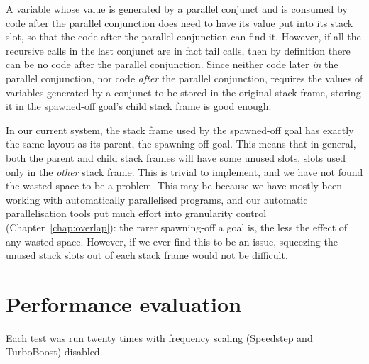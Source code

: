 A variable whose value is generated by a parallel conjunct
and is consumed by code after the parallel conjunction
does need to have its value put into its stack slot,
so that the code after the parallel conjunction can find it.
However, if all the recursive calls in the last conjunct
are in fact tail calls, then by definition
there can be no code after the parallel conjunction.
Since neither code later \emph{in} the parallel conjunction,
nor code \emph{after} the parallel conjunction,
requires the values of variables generated by a conjunct
to be stored in the original stack frame,
storing it in the spawned-off goal's child stack frame is good enough.

In our current system,
the stack frame used by the spawned-off goal
has exactly the same layout as its parent, the spawning-off goal.
This means that in general,
both the parent and child stack frames will have some unused slots,
slots used only in the \emph{other} stack frame.
This is trivial to implement,
and we have not found the wasted space to be a problem.
This may be because we have mostly been working with
automatically parallelised programs,
and our automatic parallelisation tools
put much effort into granularity control (Chapter~\ref{chap:overlap}):
the rarer spawning-off a goal is,
the less the effect of any wasted space.
However, if we ever find this to be an issue,
squeezing the unused stack slots out of each stack frame
would not be difficult.



\section{Performance evaluation}
\label{sec:lc_perf}


Each test was run twenty times
with frequency scaling (Speedstep and TurboBoost) disabled.

